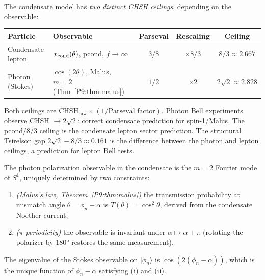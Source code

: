 \begin{remark}
\label{P9:rem:two_ceilings}
The condensate model has \emph{two distinct CHSH ceilings}, depending
on the observable:
\begin{center}
\begin{tabular}{llccc}
\toprule
Particle & Observable & Parseval & Rescaling & Ceiling \\
\midrule
Condensate lepton & $x_{\mathrm{cond}}(\theta)$, pcond, $f{\to}\infty$ & $3/8$ & $\times8/3$ & $8/3\approx2.667$ \\
Photon (Stokes)    & $\cos(2\theta)$, Malus, $m{=}2$ (Thm~\ref{P9:thm:malus})        & $1/2$ & $\times2$   & $2\sqrt{2}\approx2.828$ \\
\bottomrule
\end{tabular}
\end{center}
Both ceilings are $\text{CHSH}_\mathrm{raw}\times(1/\text{Parseval factor})$.
Photon Bell experiments~\cite{Hensen2015,Giustina2015,Shalm2015,Poh2015} observe
CHSH $\to2\sqrt{2}$: correct condensate prediction for spin-1/Malus.
The pcond/$8/3$ ceiling is the condensate lepton sector prediction.
The structural Tsirelson gap $2\sqrt{2}-8/3\approx0.161$ is the difference
between the photon and lepton ceilings, a prediction for lepton Bell tests.
\end{remark}

\begin{theorem}
\label{P9:thm:m_phot}
The photon polarization observable in the condensate is the $m=2$
Fourier mode of $S^1$, uniquely determined by two constraints:
\begin{enumerate}[label=(\roman*),noitemsep]
\item \emph{(Malus's law, Theorem~\ref{P9:thm:malus})} the transmission
  probability at mismatch angle $\theta=\phi_n-\alpha$ is
  $T(\theta)=\cos^2\theta$, derived from the condensate Noether current;
\item \emph{($\pi$-periodicity)} the observable is invariant under
  $\alpha\mapsto\alpha+\pi$ (rotating the polarizer by $180°$ restores the same measurement).
\end{enumerate}
The eigenvalue of the Stokes observable on $|\phi_n\rangle$ is
$\cos(2(\phi_n-\alpha))$, which is the unique function of $\phi_n-\alpha$
satisfying (i) and (ii).
\end{theorem}

